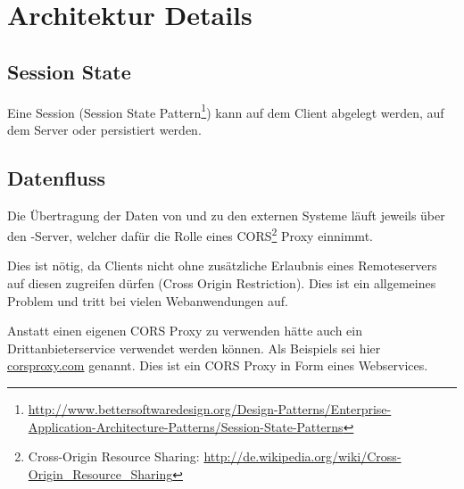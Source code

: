 \section{Architektur Details}

	\subsection{Session State}
		Eine Session (Session State Pattern\footnote{\url{http://www.bettersoftwaredesign.org/Design-Patterns/Enterprise-Application-Architecture-Patterns/Session-State-Patterns}}) kann auf dem Client abgelegt werden, auf dem Server oder persistiert werden.
		
		
		\subsection{Datenfluss}			
			Die Übertragung der Daten von und zu den externen Systeme läuft jeweils über den \eeppi-Server, welcher dafür die Rolle eines CORS\footnote{Cross-Origin Resource Sharing: \url{http://de.wikipedia.org/wiki/Cross-Origin_Resource_Sharing}} Proxy einnimmt. 
			
			Dies ist nötig, da Clients nicht ohne zusätzliche Erlaubnis eines Remoteservers
			auf diesen zugreifen dürfen (Cross Origin Restriction).
			Dies ist ein allgemeines Problem und tritt bei vielen Webanwendungen auf.
			
			Anstatt einen eigenen CORS Proxy zu verwenden hätte auch ein Drittanbieterservice verwendet werden können.
			Als Beispiels sei hier \hyperlink{http://www.corsproxy.com/}{corsproxy.com} genannt.
			Dies ist ein CORS Proxy in Form eines Webservices.
	
